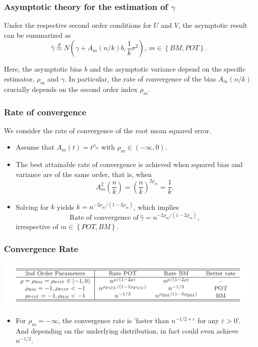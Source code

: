 \documentclass{beamer}
\newcommand{\suit}[1]{\left(#1\right)}
\newcommand{\set}[1]{\left\{#1\right\}}
\begin{document}
\begin{frame}
    \frametitle{Asymptotic theory for the estimation of $\gamma$}
    Under the respective second order conditions for $U$ and $V$, the asymptotic result can be summarized as 
    $$
\hat{\gamma}\stackrel{d}{\approx} N\suit{\gamma+A_m(n/k)b,\frac{1}{k}\sigma^2}, \ m \in \set{BM,POT}.
    $$
    
    Here, the asymptotic bias $b$ and the asymptotic variance depend on the specific estimator, $\rho_m$ and $\gamma$. In particular,
    the rate of convergence of the bias $A_m(n/k)$ crucially depends on the second order index $\rho_m$.

\end{frame}

\begin{frame}
    \frametitle{Rate of convergence}
We consider the rate of convergence of the root mean squared error.

\begin{itemize}
    \item Assume that $A_m(t)=t^{\rho_m}$ with $\rho_m\in (-\infty,0)$.
    \item The best attainable
    rate of convergence is achieved when squared bias and variance are of the same order, that is, when 
    $$
        A_m^2\suit{\frac{n}{k}} = \suit{\frac{n}{k}}^{2\rho_m}=\frac{1}{k}.
    $$
    \item Solving for $k$ yields $k=n^{-2\rho_m/(1-2\rho_m)}$, which implies
    $$
\text{Rate of convergence of} \ \hat{\gamma} = n^{-2\rho_m/(1-2\rho_m)},
    $$
    irrespective of $m \in \set{POT,BM}$.
\end{itemize}
    

\end{frame}

\begin{frame}
    \frametitle{Convergence Rate}
\includegraphics[width=1\textwidth]{fig2.png}
    
\begin{itemize}
    \item For $\rho_m=-\infty$, the convergence rate is 'faster than $n^{-1/2+\varepsilon}$ for any $\varepsilon>0$'. And depending on the underlying distribution, in fact could even achieve $n^{-1/2}$.
\end{itemize}
\end{frame}
\end{document}
